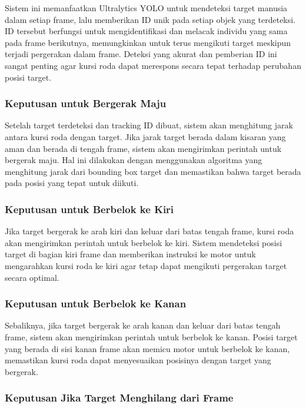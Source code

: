Sistem ini memanfaatkan Ultralytics YOLO untuk mendeteksi target manusia dalam setiap frame, lalu memberikan ID unik pada setiap objek yang terdeteksi. ID tersebut berfungsi untuk mengidentifikasi dan melacak individu yang sama pada frame berikutnya, memungkinkan untuk terus mengikuti target meskipun terjadi pergerakan dalam frame. Deteksi yang akurat dan pemberian ID ini sangat penting agar kursi roda dapat merespons secara tepat terhadap perubahan posisi target.

\subsubsection*{Keputusan untuk Bergerak Maju}
\label{subsubsec:keputusan_bergerak_maju}

Setelah target terdeteksi dan tracking ID dibuat, sistem akan menghitung jarak antara kursi roda dengan target. Jika jarak target berada dalam kisaran yang aman dan berada di tengah frame, sistem akan mengirimkan perintah untuk bergerak maju. Hal ini dilakukan dengan menggunakan algoritma yang menghitung jarak dari bounding box target dan memastikan bahwa target berada pada posisi yang tepat untuk diikuti.

\subsubsection*{Keputusan untuk Berbelok ke Kiri}
\label{subsubsec:keputusan_belok_kiri}

Jika target bergerak ke arah kiri dan keluar dari batas tengah frame, kursi roda akan mengirimkan perintah untuk berbelok ke kiri. Sistem mendeteksi posisi target di bagian kiri frame dan memberikan instruksi ke motor untuk mengarahkan kursi roda ke kiri agar tetap dapat mengikuti pergerakan target secara optimal.

\subsubsection*{Keputusan untuk Berbelok ke Kanan}
\label{subsubsec:keputusan_belok_kanan}

Sebaliknya, jika target bergerak ke arah kanan dan keluar dari batas tengah frame, sistem akan mengirimkan perintah untuk berbelok ke kanan. Posisi target yang berada di sisi kanan frame akan memicu motor untuk berbelok ke kanan, memastikan kursi roda dapat menyesuaikan posisinya dengan target yang bergerak.

\subsubsection*{Keputusan Jika Target Menghilang dari Frame}
\label{subsubsec:keputusan_target_menghilang}

